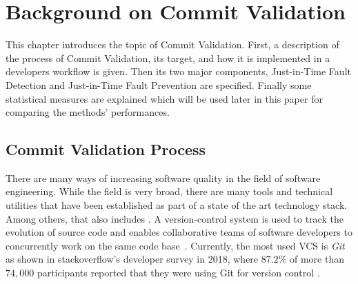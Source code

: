 

\section{Background on Commit Validation}
\label{sec:background}

This chapter introduces the topic of Commit Validation. 
First, a description of the process of Commit Validation, its target, and how it is implemented in a developers workflow is given.
Then its two major components, Just-in-Time Fault Detection and Just-in-Time Fault Prevention are specified. Finally some statistical measures are explained which will be used later in this paper for comparing the methods' performances.


\subsection{Commit Validation Process}
\label{sec:cvprocess}



There are many ways of increasing software quality in the field of software engineering. While the field is very broad, there are many tools and technical utilities that have been established as part of a state of the art technology stack. Among others, that also includes . A version-control system is used to track the evolution of source code and enables collaborative teams of software developers to concurrently work on the same code base~\cite{Chacon:2014:PG:2695634}. Currently, the most used VCS is \textit{Git} as shown in stackoverflow's developer survey in 2018, where $87.2\%$ of more than $74,000$ participants reported that they were using Git for version control \cite{Stackoverflow}.

